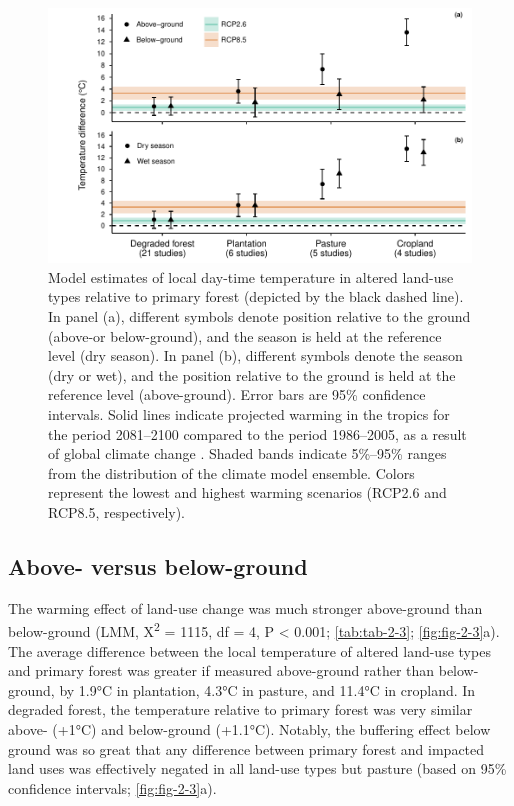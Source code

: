 \documentclass[12pt,a4paper,]{report}
\theoremstyle{definition}
\theoremstyle{definition}
\theoremstyle{definition}
\theoremstyle{remark}
\begin{document}
\begin{figure}
\includegraphics{./output/fig-2-3-1} \caption{Model estimates of local day-time temperature in altered
land-use types relative to primary forest (depicted by the black dashed
line). In panel (a), different symbols denote position relative to the
ground (above-or below-ground), and the season is held at the reference
level (dry season). In panel (b), different symbols denote the season
(dry or wet), and the position relative to the ground is held at the
reference level (above-ground). Error bars are 95\% confidence
intervals. Solid lines indicate projected warming in the tropics for the
period 2081--2100 compared to the period 1986--2005, as a result of
global climate change \citep{ipcc_climate_2013}. Shaded bands indicate
5\%--95\% ranges from the distribution of the climate model ensemble.
Colors represent the lowest and highest warming scenarios (RCP2.6 and
RCP8.5, respectively).}\label{fig:fig-2-3}
\end{figure}

\subsection{Above- versus
below-ground}\label{above--versus-below-ground}

The warming effect of land-use change was much stronger above-ground
than below-ground (LMM, Χ\textsuperscript{2} = 1115, df = 4, P
\textless{} 0.001; \autoref{tab:tab-2-3}; \autoref{fig:fig-2-3}a). The
average difference between the local temperature of altered land-use
types and primary forest was greater if measured above-ground rather
than below-ground, by 1.9°C in plantation, 4.3°C in pasture, and 11.4°C
in cropland. In degraded forest, the temperature relative to primary
forest was very similar above- (+1°C) and below-ground (+1.1°C).
Notably, the buffering effect below ground was so great that any
difference between primary forest and impacted land uses was effectively
negated in all land-use types but pasture (based on 95\% confidence
intervals; \autoref{fig:fig-2-3}a).
\end{document}
